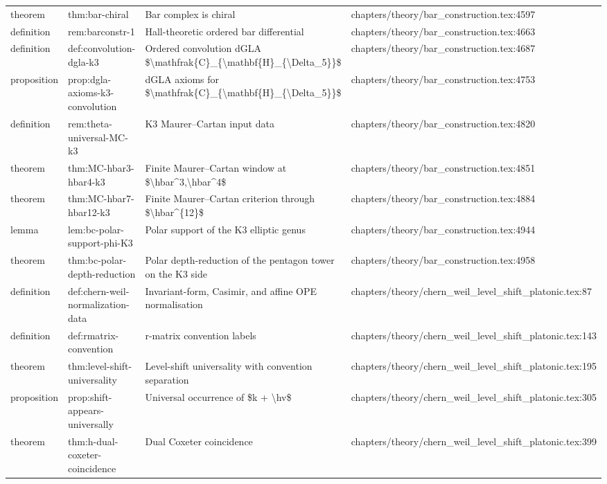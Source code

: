 \documentclass[11pt]{article}
\begin{document}
\begin{longtable}{L{0.10\textwidth}L{0.26\textwidth}L{0.42\textwidth}L{0.22\textwidth}}
theorem & thm:bar-chiral & Bar complex is chiral & chapters/theory/bar\_construction.tex:4597\\
definition & rem:barconstr-1 & Hall-theoretic ordered bar differential & chapters/theory/bar\_construction.tex:4663\\
definition & def:convolution-dgla-k3 & Ordered convolution dGLA \$\textbackslash{}mathfrak\{C\}\_\{\textbackslash{}mathbf\{H\}\_\{\textbackslash{}Delta\_5\}\}\$ & chapters/theory/bar\_construction.tex:4687\\
proposition & prop:dgla-axioms-k3-convolution & dGLA axioms for \$\textbackslash{}mathfrak\{C\}\_\{\textbackslash{}mathbf\{H\}\_\{\textbackslash{}Delta\_5\}\}\$ & chapters/theory/bar\_construction.tex:4753\\
definition & rem:theta-universal-MC-k3 & K3 Maurer--Cartan input data & chapters/theory/bar\_construction.tex:4820\\
theorem & thm:MC-hbar3-hbar4-k3 & Finite Maurer--Cartan window at \$\textbackslash{}hbar\textasciicircum{}3,\textbackslash{}hbar\textasciicircum{}4\$ & chapters/theory/bar\_construction.tex:4851\\
theorem & thm:MC-hbar7-hbar12-k3 & Finite Maurer--Cartan criterion through \$\textbackslash{}hbar\textasciicircum{}\{12\}\$ & chapters/theory/bar\_construction.tex:4884\\
lemma & lem:bc-polar-support-phi-K3 & Polar support of the K3 elliptic genus & chapters/theory/bar\_construction.tex:4944\\
theorem & thm:bc-polar-depth-reduction & Polar depth-reduction of the pentagon tower on the K3 side & chapters/theory/bar\_construction.tex:4958\\
definition & def:chern-weil-normalization-data & Invariant-form, Casimir, and affine OPE normalisation & chapters/theory/chern\_weil\_level\_shift\_platonic.tex:87\\
definition & def:rmatrix-convention & r-matrix convention labels & chapters/theory/chern\_weil\_level\_shift\_platonic.tex:143\\
theorem & thm:level-shift-universality & Level-shift universality with convention separation & chapters/theory/chern\_weil\_level\_shift\_platonic.tex:195\\
proposition & prop:shift-appears-universally & Universal occurrence of \$k + \textbackslash{}hv\$ & chapters/theory/chern\_weil\_level\_shift\_platonic.tex:305\\
theorem & thm:h-dual-coxeter-coincidence & Dual Coxeter coincidence & chapters/theory/chern\_weil\_level\_shift\_platonic.tex:399\\

\end{longtable}
\end{document}
